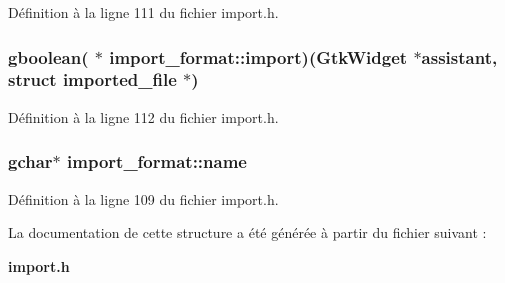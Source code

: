 Définition à la ligne 111 du fichier import.h.

\subsubsection[{import}]{\setlength{\rightskip}{0pt plus 5cm}gboolean( $\ast$  {\bf import\_\-format::import})(GtkWidget $\ast$assistant, struct {\bf imported\_\-file} $\ast$)}\label{structimport__format_aa4fbb3045ac2172614b166a4dda07822}


Définition à la ligne 112 du fichier import.h.

\subsubsection[{name}]{\setlength{\rightskip}{0pt plus 5cm}gchar$\ast$ {\bf import\_\-format::name}}\label{structimport__format_af9cf8699252e2fc46a307afd3ed73cd2}


Définition à la ligne 109 du fichier import.h.



La documentation de cette structure a été générée à partir du fichier suivant :\begin{DoxyCompactItemize}
\item 
{\bf import.h}\end{DoxyCompactItemize}
